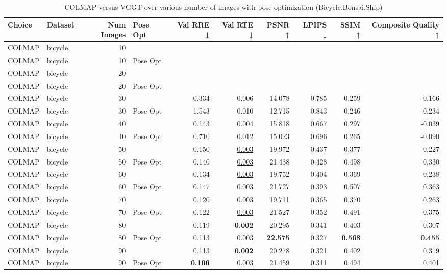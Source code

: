 \begin{table}[H]
\caption{\ifdefined\customcaption \customcaption \else COLMAP versus VGGT over various number of images with pose optimization (Bicycle,Bonsai,Ship) \fi}
\label{tab:01_num_images_pose_opt_bicycle,bonsai,ship}
\centering
\scriptsize
\begin{tabular}{llrlrrrrrr}
\toprule
Choice & Dataset & Num Images & Pose Opt & Val RRE ↓ & Val RTE ↓ & PSNR ↑ & LPIPS ↓ & SSIM ↑ & Composite Quality ↑ \\
\midrule
COLMAP & bicycle & 10 &  &  &  &  &  &  &  \\
COLMAP & bicycle & 10 & Pose Opt &  &  &  &  &  &  \\
COLMAP & bicycle & 20 &  &  &  &  &  &  &  \\
COLMAP & bicycle & 20 & Pose Opt &  &  &  &  &  &  \\
COLMAP & bicycle & 30 &  & 0.334 & 0.006 & 14.078 & 0.785 & 0.259 & -0.166 \\
COLMAP & bicycle & 30 & Pose Opt & 1.543 & 0.010 & 12.715 & 0.843 & 0.246 & -0.234 \\
COLMAP & bicycle & 40 &  & 0.143 & 0.004 & 15.818 & 0.667 & 0.297 & -0.039 \\
COLMAP & bicycle & 40 & Pose Opt & 0.710 & 0.012 & 15.023 & 0.696 & 0.265 & -0.090 \\
COLMAP & bicycle & 50 &  & 0.150 & \underline{0.003} & 19.972 & 0.437 & 0.377 & 0.227 \\
COLMAP & bicycle & 50 & Pose Opt & 0.140 & \underline{0.003} & 21.438 & 0.428 & 0.498 & 0.330 \\
COLMAP & bicycle & 60 &  & 0.134 & \underline{0.003} & 19.752 & 0.404 & 0.369 & 0.238 \\
COLMAP & bicycle & 60 & Pose Opt & 0.147 & \underline{0.003} & 21.727 & 0.393 & 0.507 & 0.363 \\
COLMAP & bicycle & 70 &  & 0.120 & \underline{0.003} & 19.711 & 0.365 & 0.370 & 0.263 \\
COLMAP & bicycle & 70 & Pose Opt & 0.122 & \underline{0.003} & 21.527 & 0.352 & 0.491 & 0.375 \\
COLMAP & bicycle & 80 &  & 0.119 & \textbf{0.002} & 20.295 & 0.341 & 0.403 & 0.307 \\
COLMAP & bicycle & 80 & Pose Opt & 0.113 & \underline{0.003} & \textbf{22.575} & 0.327 & \textbf{0.568} & \textbf{0.455} \\
COLMAP & bicycle & 90 &  & 0.113 & \textbf{0.002} & 20.278 & 0.321 & 0.402 & 0.319 \\
COLMAP & bicycle & 90 & Pose Opt & \textbf{0.106} & \underline{0.003} & 21.459 & 0.311 & 0.494 & 0.401 \\

\end{tabular}
\end{table}
